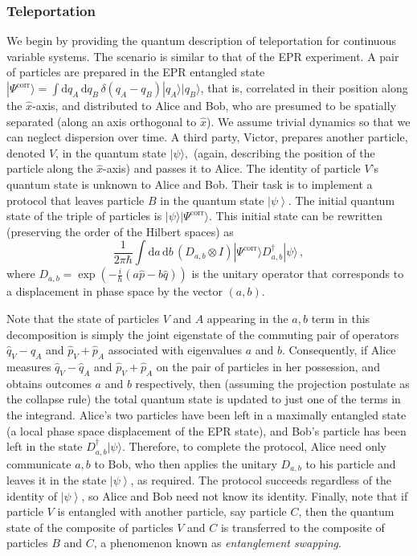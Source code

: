 \documentclass[pra,superscriptaddress,nofootinbib,12pt]{revtex4-2}
\begin{document}
\subsubsection{Teleportation}
\label{sec:Teleportation}

We begin by providing the quantum description of teleportation for continuous variable systems.  The scenario is similar to that of the EPR experiment.  A pair of particles are prepared in the EPR entangled state $|\Psi^{\textrm{corr}}\rangle = \int \textrm{d}q_A\,\textrm{d}q_B\,\delta(q_A-q_B)|q_A\rangle|q_B\rangle$, that is, correlated in their position along the $\hat{x}$-axis, and distributed to Alice and Bob, who are presumed to be spatially separated (along an axis orthogonal to $\hat{x}$).  We assume trivial dynamics so that we can neglect dispersion over time.  A third party, Victor, prepares another particle, denoted $V$, in the quantum state $|\psi\rangle,$ (again, describing the position of the particle along the $\hat{x}$-axis) and passes it to Alice.  The identity of particle $V$'s quantum state is unknown to Alice and Bob. Their task is to implement a protocol that leaves particle $B$ in the quantum state $\left| \psi \right\rangle$.  The initial quantum state of the triple of particles is $|\psi\rangle |\Psi^{\textrm{corr}}\rangle$.
This initial state can be rewritten (preserving the order of the Hilbert spaces) as
\begin{equation}
  \frac{1}{2\pi\hbar} \int \textrm{d}a\,\textrm{d}b\,(D_{a,b} \otimes I)|\Psi^{\textrm{corr}}\rangle D^{\dag}_{a,b}|\psi\rangle\,,
\end{equation}
where $D_{a,b}=\exp(-\frac{i}{\hbar}(a\hat{p}-b\hat{q}))$ is the unitary operator that corresponds to a displacement in phase space by the vector $(a,b)$.

Note that the state of particles $V$ and $A$ appearing in the $a,b$ term in this decomposition is simply the joint eigenstate of the commuting pair of operators $\hat{q}_V-\hat{q}_A$ and $\hat{p}_V+\hat{p}_A$ associated with eigenvalues $a$ and $b$.  Consequently, if Alice measures $\hat{q}_V-\hat{q}_A$ and $\hat{p}_V+\hat{p}_A$ on the pair of particles in her possession, and obtains outcomes $a$ and $b$ respectively, then (assuming the projection postulate as the collapse rule) the total quantum state is updated to just one of the terms in the integrand.  Alice's two particles have been left in a maximally entangled state (a local phase space displacement of the EPR state), and Bob's particle has been left in the state $D^{\dag}_{a,b} |\psi \rangle$.  Therefore, to complete the protocol, Alice need only communicate $a,b$ to Bob, who then applies the unitary $D_{a,b}$ to his particle and leaves it in the state $\left| \psi \right\rangle$, as required.  The protocol succeeds regardless of the identity of $\left| \psi \right\rangle$, so Alice and Bob need not know its identity. Finally, note that if particle $V$ is entangled with another particle, say particle $C$, then the quantum state of the composite of particles $V$ and $C$ is transferred to the composite of particles $B$ and $C$, a phenomenon known as \emph{entanglement swapping}.
\end{document}
